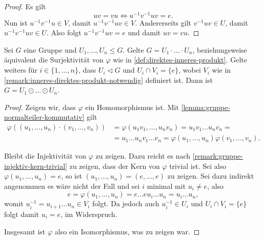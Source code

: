 \begin{proof}
    Es gilt
    $$ uv = vu \Leftrightarrow u^{-1} v^{-1} u v = e. $$
    Nun ist $u^{-1} v^{-1} u \in V$, damit $u^{-1} v^{-1} u v \in V$. Andererseits gilt $v^{-1} u v \in U$, damit $u^{-1} v^{-1} u v \in U$. Also folgt $u^{-1} v^{-1} u v = e$ und damit $uv=vu$.
\end{proof}

\begin{proposition} \label{prop:kriterien-direktes-inneres-produkt}
    Sei $G$ eine Gruppe und $U_1, \hdots, U_n \leq G$. Gelte $G = U_1 \cdot \hdots \cdot U_n$, beziehungsweise äquivalent die Surjektivität von $\varphi$ wie in \cref{def:direktes-inneres-produkt}. Gelte weiters für $i \in \{ 1, \hdots, n \} $, dass $U_i \vartriangleleft G$ und $U_i \cap V_i = \{ e \} $, wobei $V_i$ wie in \cref{remark:inneres-direktes-produkt-notwendig} definiert ist. Dann ist $G = U_1 \odot \hdots \odot U_n $.
\end{proposition}

\begin{proof}
    Zeigen wir, dass $\varphi$ ein Homomorphismus ist. Mit \cref{lemma:gruppe-normalteiler-kommutativ} gilt
    \begin{align*}        
        \varphi((u_1, \hdots, u_n) \cdot (v_1, \hdots, v_n)) &= \varphi(u_1 v_1, \hdots, u_n v_n) = u_1 v_1 \hdots u_n v_n = \\ &= u_1 \hdots u_n v_1 \hdots v_n = \varphi(u_1, \hdots, u_n) \varphi(v_1, \hdots, v_n).
    \end{align*}

    Bleibt die Injektivität von $\varphi$ zu zeigen. Dazu reicht es nach \cref{remark:gruppe-injektiv-kern-trivial} zu zeigen, dass der Kern von $\varphi$ trivial ist. Sei also $\varphi(u_1, \hdots, u_n) = e$, so ist $(u_1, \hdots, u_n) = (e, \hdots, e)$ zu zeigen. Sei dazu indirekt angenommen es wäre nicht der Fall und sei $i$ minimal mit $u_i \neq e$, also
    $$ e = \varphi(u_1, \hdots, u_n) = e \hdots e u_i \hdots u_n = u_i \hdots u_n, $$
    womit $u_i^{-1} = u_{i+1} ... u_n \in V_i$ folgt. Da jedoch auch $u_i^{-1} \in U_i$ und $U_i \cap V_i = \{ e \}$ folgt damit $u_i = e$, im Widerspruch.

    Insgesamt ist $\varphi$ also ein Isomorphismus, was zu zeigen war.
\end{proof}

